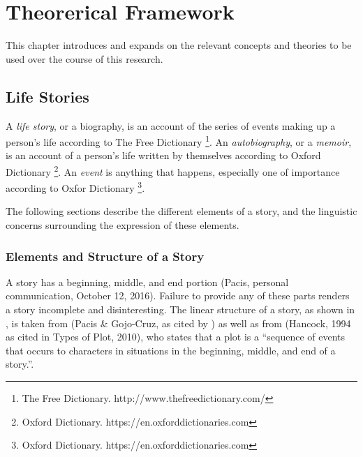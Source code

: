 %
%
%                 


\chapter{Theorerical Framework}
\label{sec:theoreticalframewrok}

This chapter introduces and expands on the relevant concepts and theories to be used over the course of this research.

\section{Life Stories}
A \textit{life story}, or a biography, is an account of the series of events making up a person's life according to The Free Dictionary \footnote{The Free Dictionary. http://www.thefreedictionary.com/}. An \textit{autobiography}, or a \textit{memoir}, is an account of a person's life written by themselves according to Oxford Dictionary \footnote{Oxford Dictionary. https://en.oxforddictionaries.com}. An \textit{event} is anything that happens, especially one of importance according to Oxfor Dictionary \footnote{Oxford Dictionary. https://en.oxforddictionaries.com}.

The following sections describe the different elements of a story, and the linguistic concerns surrounding the expression of these elements. 

\subsection{Elements and Structure of a Story}
A story has a beginning, middle, and end portion (Pacis, personal communication, October 12, 2016). Failure to provide any of these parts renders a story incomplete and disinteresting. The linear structure of a story, as shown in , is taken from (Pacis \& Gojo-Cruz, as cited by \cite{Chua2016}) as well as from (Hancock, 1994 as cited in Types of Plot, 2010), who states that a plot is a ``sequence of events that occurs to characters in situations in the beginning, middle, and end of a story.''.

